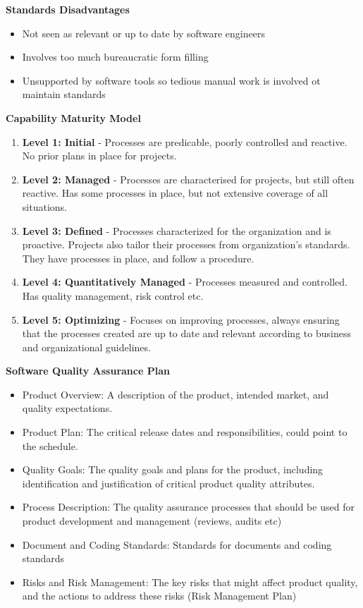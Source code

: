 \documentclass[a4paper,10pt]{article}
\begin{document}
\newpage
\noindent \textcolor{BlueGreen}{\textbf{Standards Disadvantages}}
\begin{itemize}
	\item Not seen as relevant or up to date by software engineers 
	\item Involves too much bureaucratic form filling 
	\item Unsupported by software tools so tedious manual work is involved ot maintain standards
\end{itemize}
\textcolor{BlueGreen}{\textbf{Capability Maturity Model}}
\begin{enumerate}
	\item \textbf{Level 1: Initial} - Processes are predicable, poorly controlled and reactive. No prior plans in place for projects. 
	\item \textbf{Level 2: Managed} - Processes are characterised for projects, but still often reactive. Has some processes in place, but not extensive coverage of all situations. 
	\item \textbf{Level 3: Defined} - Processes characterized for the organization and is proactive. Projects also tailor their processes from organization's standards. They have processes in place, and follow a procedure. 
	\item \textbf{Level 4: Quantitatively Managed} - Processes measured and controlled. Has quality management, risk control etc. 
	\item \textbf{Level 5: Optimizing} - Focuses on improving processes, always ensuring that the processes created are up to date and relevant according to business and organizational guidelines. 
\end{enumerate}
\textcolor{BlueGreen}{\textbf{Software Quality Assurance Plan}}
\begin{itemize}
	\item Product Overview: A description of the product, intended market, and quality expectations. 
	\item Product Plan: The critical release dates and responsibilities, could point to the schedule. 
	\item Quality Goals: The quality goals and plans for the product, including identification and justification of critical product quality attributes. 
	\item Process Description: The quality assurance processes that should be used for product development and management (reviews, audits etc)
	\item Document and Coding Standards: Standards for documents and coding standards 
	\item Risks and Risk Management: The key risks that might affect product quality, and the actions to address these risks (Risk Management Plan) 
\end{itemize}
\end{document}
